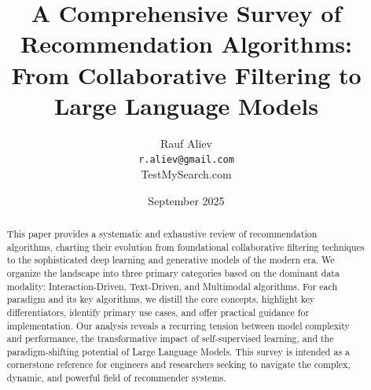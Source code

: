 \documentclass{article}
\title{\textbf{A Comprehensive Survey of Recommendation Algorithms: \\ From Collaborative Filtering to Large Language Models}}
\author{Rauf Aliev \\ \texttt{r.aliev@gmail.com} \\ TestMySearch.com}
\date{September 2025}
\begin{document}
    \onecolumn

    \maketitle

    \begin{abstract}
        This paper provides a systematic and exhaustive review of recommendation algorithms, charting their evolution from foundational collaborative filtering techniques to the sophisticated deep learning and generative models of the modern era. We organize the landscape into three primary categories based on the dominant data modality: Interaction-Driven, Text-Driven, and Multimodal algorithms. For each paradigm and its key algorithms, we distill the core concepts, highlight key differentiators, identify primary use cases, and offer practical guidance for implementation. Our analysis reveals a recurring tension between model complexity and performance, the transformative impact of self-supervised learning, and the paradigm-shifting potential of Large Language Models. This survey is intended as a cornerstone reference for engineers and researchers seeking to navigate the complex, dynamic, and powerful field of recommender systems.
    \end{abstract}
\end{document}
